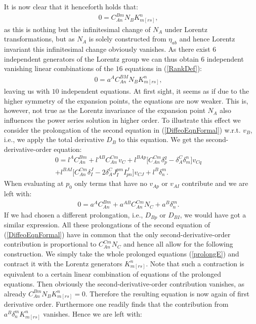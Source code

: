 It is now clear that it henceforth holds that:
\begin{align}
    0 = C^{Bm}_{An}N_B K_{m[rs]}^n,
\end{align}
as this is nothing but the infinitesimal change of $N_A$ under Lorentz transformations, but as $N_A$ is solely constructed from $\eta_{ab}$ and hence Lorentz invariant this infinitesimal change obviously vanishes. As there exist $6$ independent generators of the Lorentz group we can thus obtain $6$ independent vanishing linear combinations of the $16$ equations in (\ref{RankDef}):
\begin{align}
    0 = a^A C^{BM}_{An}N_B K_{m[rs]}^n,
\end{align}
leaving us with $10$ independent equations. At first sight, it seems as if due to the higher symmetry of the expansion points, the equations are now weaker. This is, however, not true as the Lorentz invariance of the expansion point $N_A$ also influences the power series solution in higher order. To illustrate this effect we consider the prolongation of the second equation in (\ref{DiffeoEqnFormal}) w.r.t. $v_B$, i.e., we apply the total derivative $D_B$ to this equation. We get the second-derivative-order equation:
\begin{multline}
    0 = l^AC_{An}^{Bm} + l^{AB}C_{An}^{Cm}v_C + l^{BAp} \bigl[ C_{An}^{Cm} \delta_p^q - \delta_A^C \delta_m^n \bigr] v_{Cq}\\
    + l^{BAI} \bigl[ C_{An}^{Cm} \delta_I^J - 2 \delta_A^C J_I^{pm} I^J_{pn}  \bigr] v_{CJ} + l^{B} \delta^m_n.
\end{multline}
When evaluating at $p_0$ only terms that have no $v_{Ap}$ or $v_{AI}$ contribute and we are left with:
\begin{align}\label{prolongE}
    0 = a^A C_{An}^{Bm} + a^{AB} C_{An}^{Cm} N_C +  a^B \delta^m_n.
\end{align}
If we had chosen a different prolongation, i.e., $D_{Bp}$ or $D_{BI}$, we would have got a similar expression. All these prolongations of the second equation of (\ref{DiffeoEqnFormal}) have in common that the only second-derivative-order contribution is proportional to $C^{Cm}_{An} N_C$ and hence all allow for the following construction. We simply take the whole prolonged equations (\ref{prolongE}) and contract it with the Lorentz generators $K_{m[rs]}^n$. Note that such a contraction is equivalent to a certain linear combination of equations of the prolonged equations. Then obviously the second-derivative-order contribution vanishes, as already $C_{An}^{Bm} N_B K_{m[rs]}^n = 0$.  Therefore the resulting equation is now again of first derivative order. Furthermore one readily finds that the contribution from $a^B \delta^m_n K_{m[rs]}^n$ vanishes. Hence we are left with: 
